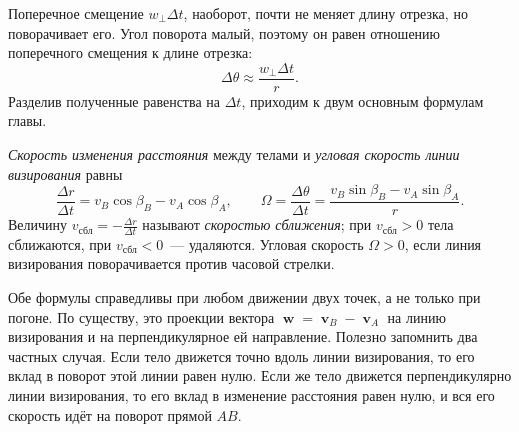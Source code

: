 \documentclass[../main.tex]{subfiles}
\begin{document}
Поперечное смещение $w_\perp\Delta t$, наоборот, почти не меняет длину отрезка, но
поворачивает его. Угол поворота малый, поэтому он равен отношению поперечного
смещения к длине отрезка:
\[
\Delta\theta \approx \frac{w_\perp\Delta t}{r}.
\]
Разделив полученные равенства на $\Delta t$, приходим к двум основным формулам главы.

\begin{definition}
\textit{Скорость изменения расстояния} между телами и \textit{угловая скорость
линии визирования} равны
\[
\frac{\Delta r}{\Delta t} = v_B\cos\beta_B - v_A\cos\beta_A,
\qquad
\Omega = \frac{\Delta\theta}{\Delta t} = \frac{v_B\sin\beta_B - v_A\sin\beta_A}{r}.
\]
Величину $v_{\text{сбл}} = -\frac{\Delta r}{\Delta t}$ называют \textit{скоростью
сближения}; при $v_{\text{сбл}} > 0$ тела сближаются, при $v_{\text{сбл}} < 0$~---
удаляются. Угловая скорость $\Omega > 0$, если линия визирования поворачивается
против часовой стрелки.
\end{definition}

Обе формулы справедливы при любом движении двух точек, а не только при погоне.
По существу, это проекции вектора $\mbfw = \mbfv_B - \mbfv_A$ на линию визирования
и на перпендикулярное ей направление. Полезно запомнить два частных случая. Если
тело движется точно вдоль линии визирования, то его вклад в поворот этой линии равен
нулю. Если же тело движется перпендикулярно линии визирования, то его вклад в
изменение расстояния равен нулю, и вся его скорость идёт на поворот прямой $AB$.
\end{document}
